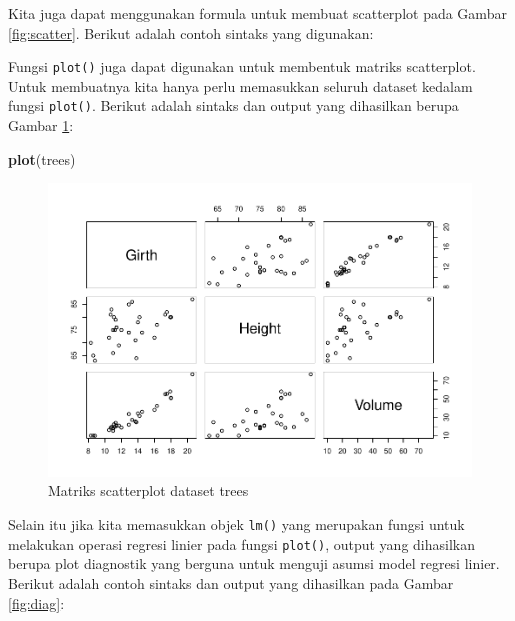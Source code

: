\documentclass[]{book}
\newenvironment{Shaded}{\begin{snugshade}}{\end{snugshade}}
\newcommand{\KeywordTok}[1]{\textcolor[rgb]{0.13,0.29,0.53}{\textbf{#1}}}
\newcommand{\StringTok}[1]{\textcolor[rgb]{0.31,0.60,0.02}{#1}}
\newcommand{\OperatorTok}[1]{\textcolor[rgb]{0.81,0.36,0.00}{\textbf{#1}}}
\newcommand{\NormalTok}[1]{#1}
\begin{document}
Kita juga dapat menggunakan formula untuk membuat scatterplot pada
Gambar \ref{fig:scatter}. Berikut adalah contoh sintaks yang digunakan:

\begin{Shaded}
\end{Shaded}

Fungsi \texttt{plot()} juga dapat digunakan untuk membentuk matriks
scatterplot. Untuk membuatnya kita hanya perlu memasukkan seluruh
dataset kedalam fungsi \texttt{plot()}. Berikut adalah sintaks dan
output yang dihasilkan berupa Gambar \ref{fig:scatter2}:

\begin{Shaded}
\begin{Highlighting}[]
\KeywordTok{plot}\NormalTok{(trees)}
\end{Highlighting}
\end{Shaded}

\begin{figure}

{\centering \includegraphics[width=0.8\linewidth]{EnvStat_files/figure-latex/scatter2-1} 

}

\caption{Matriks scatterplot dataset trees}\label{fig:scatter2}
\end{figure}

Selain itu jika kita memasukkan objek \texttt{lm()} yang merupakan
fungsi untuk melakukan operasi regresi linier pada fungsi
\texttt{plot()}, output yang dihasilkan berupa plot diagnostik yang
berguna untuk menguji asumsi model regresi linier. Berikut adalah contoh
sintaks dan output yang dihasilkan pada Gambar \ref{fig:diag}:
\end{document}
